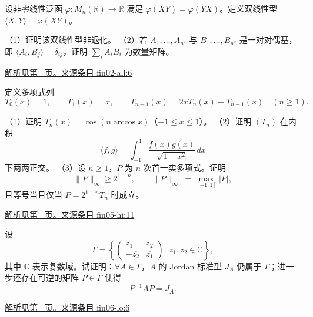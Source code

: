 \documentclass[12pt,fontset=fandol]{ctexart}
\begin{document}
\begin{example}\label{ex:fin02-all:6}

设非零线性泛函 $\varphi:M_n(\mathbb R)\to\mathbb R$ 满足
$\varphi(XY)=\varphi(YX)$。定义双线性型
$\langle X,Y\rangle=\varphi(XY)$。

（1）证明该双线性型非退化。
（2）若 $A_1,\ldots,A_{n^2}$ 与 $B_1,\ldots,B_{n^2}$ 是一对对偶基，即 $\langle A_i,B_j\rangle=\delta_{ij}$，证明 $\sum_i A_iB_i$ 为数量矩阵。

\par\hyperref[ans:fin02-all:6]{解析见第~\pageref{ans:fin02-all:6} 页。}\quad\href{https://github.com/lzxcr/cmc-mathematics/blob/64916fa1fdbc3e444a652eca204d5669058ee321/src/problems/finals/02/06.md}{来源条目 fin02-all:6}

\end{example}

\begin{example}\label{ex:fin05-hi:11}

定义多项式列
\[
T_0(x)=1,\qquad T_1(x)=x,\qquad
T_{n+1}(x)=2xT_n(x)-T_{n-1}(x)\quad(n\ge1).
\]

（1）证明 $T_n(x)=\cos(n\arccos x)$（$-1\le x\le1$）。
（2）证明 $(T_n)$ 在内积
\[
\langle f,g\rangle=\int_{-1}^1\frac{f(x)g(x)}{\sqrt{1-x^2}}\,dx
\]
下两两正交。
（3）设 $n\ge1$，$P$ 为 $n$ 次首一实多项式。证明
\[
\|P\|_\infty\ge2^{1-n},\qquad
\|P\|_\infty:=\max_{[-1,1]}|P|,
\]
且等号当且仅当 $P=2^{1-n}T_n$ 时成立。

\par\hyperref[ans:fin05-hi:11]{解析见第~\pageref{ans:fin05-hi:11} 页。}\quad\href{https://github.com/lzxcr/cmc-mathematics/blob/64916fa1fdbc3e444a652eca204d5669058ee321/src/problems/finals/05/12.md}{来源条目 fin05-hi:11}

\end{example}

\begin{example}\label{ex:fin06-lo:6}

设
\[
\Gamma=\left\{\begin{pmatrix}z_1&z_2\\-\overline{z_2}&\overline{z_1}\end{pmatrix}:\ z_1,z_2\in\mathbb{C}\right\},
\]
其中 $\mathbb{C}$ 表示复数域。试证明：$\forall A\in\Gamma$，$A$ 的 Jordan 标准型 $J_A$ 仍属于 $\Gamma$；进一步还存在可逆的矩阵 $P\in\Gamma$ 使得
\[
P^{-1}AP=J_A .
\]

\par\hyperref[ans:fin06-lo:6]{解析见第~\pageref{ans:fin06-lo:6} 页。}\quad\href{https://github.com/lzxcr/cmc-mathematics/blob/64916fa1fdbc3e444a652eca204d5669058ee321/src/problems/finals/06/06.md}{来源条目 fin06-lo:6}

\end{example}
\end{document}

